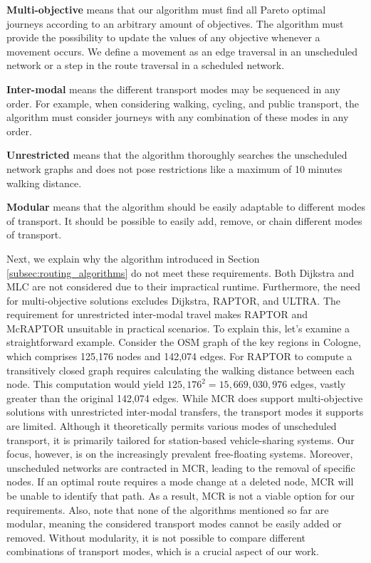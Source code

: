 \textbf{Multi-objective} means that our algorithm must find all Pareto optimal journeys according to an arbitrary amount of objectives.
The algorithm must provide the possibility to update the values of any objective whenever a movement occurs.
We define a movement as an edge traversal in an unscheduled network or a step in the route traversal in a scheduled network.

\textbf{Inter-modal} means the different transport modes may be sequenced in any order.
For example, when considering walking, cycling, and public transport, the algorithm must consider journeys with any combination of these modes in any order.

\textbf{Unrestricted} means that the algorithm thoroughly searches the unscheduled network graphs and does not pose restrictions like a maximum of 10 minutes walking distance.

\textbf{Modular} means that the algorithm should be easily adaptable to different modes of transport.
It should be possible to easily add, remove, or chain different modes of transport.


Next, we explain why the algorithm introduced in Section \ref{subsec:routing_algorithms} do not meet these requirements.
Both Dijkstra and MLC are not considered due to their impractical runtime.
Furthermore, the need for multi-objective solutions excludes Dijkstra, RAPTOR, and ULTRA.
The requirement for unrestricted inter-modal travel makes RAPTOR and McRAPTOR unsuitable in practical scenarios.
To explain this, let's examine a straightforward example.
Consider the OSM graph of the key regions in Cologne, which comprises 125,176 nodes and 142,074 edges.
For RAPTOR to compute a transitively closed graph requires calculating the walking distance between each node.
This computation would yield \(125,176^2 = 15,669,030,976\) edges, vastly greater than the original 142,074 edges.
While MCR does support multi-objective solutions with unrestricted inter-modal transfers, the transport modes it supports are limited.
Although it theoretically permits various modes of unscheduled transport, it is primarily tailored for station-based vehicle-sharing systems.
Our focus, however, is on the increasingly prevalent free-floating systems.
Moreover, unscheduled networks are contracted in MCR, leading to the removal of specific nodes.
If an optimal route requires a mode change at a deleted node, MCR will be unable to identify that path.
As a result, MCR is not a viable option for our requirements.
Also, note that none of the algorithms mentioned so far are modular, meaning the considered transport modes cannot be easily added or removed.
Without modularity, it is not possible to compare different combinations of transport modes, which is a crucial aspect of our work.

